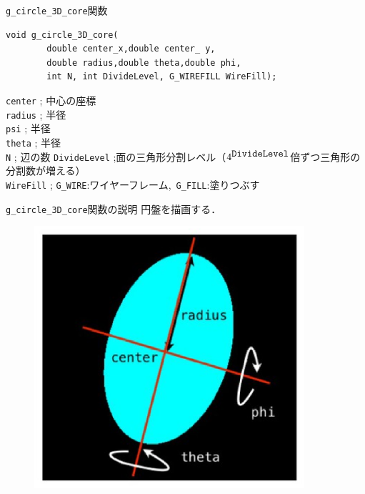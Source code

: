 \documentclass[a4paper,12pt]{jsarticle}%
\begin{document}
\begin{itembox}[l]{\texttt{g\_circle\_3D\_core}関数}
\begin{verbatim}
void g_circle_3D_core(
        double center_x,double center_ y,
        double radius,double theta,double phi,        
        int N, int DivideLevel, G_WIREFILL WireFill);
\end{verbatim}
\verb|center| ; 中心の座標\\
\verb|radius| ; 半径\\
\verb|psi| ; 半径\\
\verb|theta| ; 半径\\
\verb|N| ; 辺の数
\verb|DivideLevel| ;面の三角形分割レベル（$4^{\verb|DivideLevel|}$倍ずつ三角形の分割数が増える）\\
\verb|WireFill| ; \verb|G_WIRE|:ワイヤーフレーム,\ \verb|G_FILL|:塗りつぶす \\
\end{itembox}

\begin{itembox}[l]{\texttt{g\_circle\_3D\_core}関数の説明}
円盤を描画する．
\end{itembox}
\begin{figure}[htb]
	\includegraphics[width=100mm]{./Figures/eps/Canvas_g_circle.eps}
\end{figure}
\end{document}
